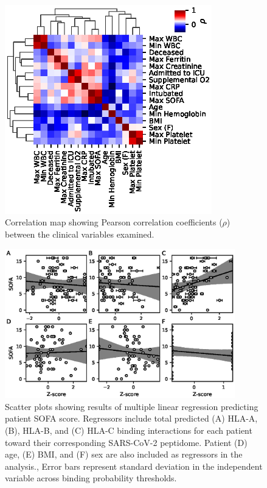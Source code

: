 \documentclass[utf8]{frontiers_suppmat} %
\begin{document}
\onecolumn
{}

\title {{}}


\maketitle






\begin{figure}[htbp]
\begin{center}
\includegraphics[width=9cm]{FigureS1}%
\end{center}
\caption{Correlation map showing Pearson correlation coefficients ($\rho$) between the clinical variables examined.}\label{fig:1}
\end{figure}


\begin{figure}[htbp]
\begin{center}
\includegraphics[width=10cm]{FigureS2}
\end{center}
\caption{Scatter plots showing results of multiple linear regression predicting patient SOFA score. Regressors include total predicted (A) HLA-A, (B), HLA-B, and (C) HLA-C binding interactions for each patient toward their corresponding SARS-CoV-2 peptidome. Patient (D) age, (E) BMI, and (F) sex are also included as regressors in the analysis., Error bars represent standard deviation in the independent variable across binding probability thresholds.}\label{fig:2}
\end{figure}
\end{document}
